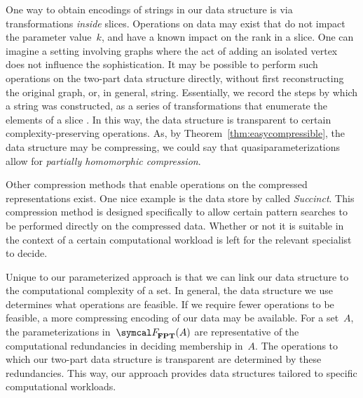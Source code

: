 One way to obtain encodings of strings in our data structure is via transformations \emph{inside} slices.
Operations on data may exist that do not impact the parameter value~$k$, and have a known impact on the rank in a slice.
One can imagine a setting involving graphs where the act of adding an isolated vertex does not influence the sophistication.
It may be possible to perform such operations on the two-part data structure directly, without first reconstructing the original graph, or, in general, string.
Essentially, we record the steps by which a string was constructed, as a series of transformations that enumerate the elements of a slice \parencite[see also][Theorem~4.2]{hemachandra1991sets}.
In this way, the data structure is transparent to certain complexity-preserving operations.
As, by Theorem~\ref{thm:easycompressible}, the data structure may be compressing, we could say that quasiparameterizations allow for \emph{partially homomorphic compression}.

Other compression methods that enable operations on the compressed representations exist.
One nice example is the data store by \textcite{agarwal2015succinct} called \emph{Succinct}.
This compression method is designed specifically to allow certain pattern searches to be performed directly on the compressed data.
Whether or not it is suitable in the context of a certain computational workload is left for the relevant specialist to decide.

Unique to our parameterized approach is that we can link our data structure to the computational complexity of a set.
In general, the data structure we use determines what operations are feasible.
If we require fewer operations to be feasible, a more compressing encoding of our data may be available.
For a set~$A$, the parameterizations in~$\calF_\cl{FPT}(A)$ are representative of the computational redundancies in deciding membership in~$A$.
The operations to which our two-part data structure is transparent are determined by these redundancies.
This way, our approach provides data structures tailored  to specific computational workloads.
